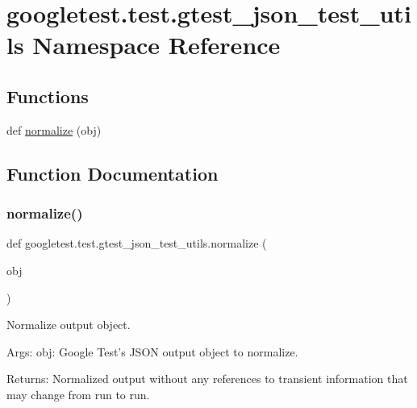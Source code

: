 \hypertarget{namespacegoogletest_1_1test_1_1gtest__json__test__utils}{}\section{googletest.\+test.\+gtest\+\_\+json\+\_\+test\+\_\+utils Namespace Reference}
\label{namespacegoogletest_1_1test_1_1gtest__json__test__utils}
\subsection*{Functions}
\begin{DoxyCompactItemize}
\item 
def \mbox{\hyperlink{namespacegoogletest_1_1test_1_1gtest__json__test__utils_a707a076db5247498f0620829ac91f186}{normalize}} (obj)
\end{DoxyCompactItemize}


\subsection{Function Documentation}
\mbox{\label{namespacegoogletest_1_1test_1_1gtest__json__test__utils_a707a076db5247498f0620829ac91f186}} 
\subsubsection{\texorpdfstring{normalize()}{normalize()}}
{\footnotesize\ttfamily def googletest.\+test.\+gtest\+\_\+json\+\_\+test\+\_\+utils.\+normalize (\begin{DoxyParamCaption}\item[{}]{obj }\end{DoxyParamCaption})}

\begin{DoxyVerb}Normalize output object.

Args:
   obj: Google Test's JSON output object to normalize.

Returns:
   Normalized output without any references to transient information that may
   change from run to run.
\end{DoxyVerb}
 